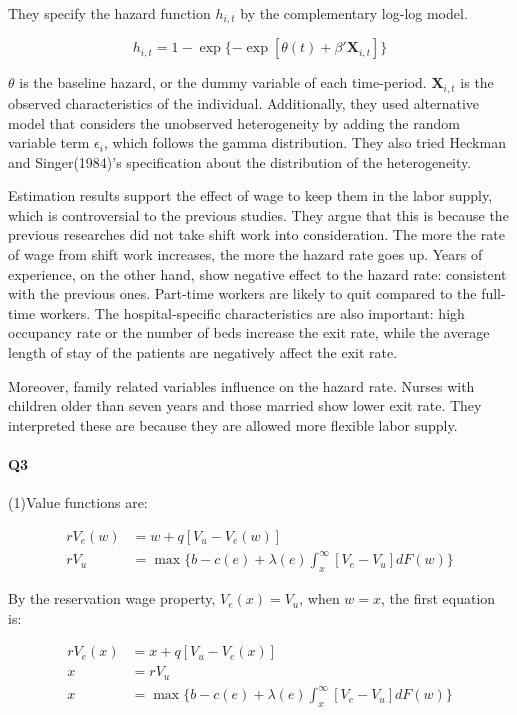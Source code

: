 \documentclass[dvipdfmx, 12pt]{article}
\begin{document}
They specify the hazard function $h_{i, t}$ by the complementary log-log model.

\[
h_{i, t} = 1 - \exp \{ - \exp[\theta(t) + \beta' \mathbf{X}_{i,t}] \}
\]

$\theta$ is the baseline hazard, or the dummy variable of each time-period. $\mathbf{X}_{i,t}$ is the observed characteristics of the individual. Additionally, they used alternative model that considers the unobserved heterogeneity by adding the random variable term $\epsilon_i$, which follows the gamma distribution. They also tried Heckman and Singer(1984)'s specification about the distribution of the heterogeneity.

\vspace{0.7zw}

Estimation results support the effect of wage to keep them in the labor supply, which is controversial to the previous studies. They argue that this is because the previous researches did not take shift work into consideration. The more the rate of wage from shift work increases, the more the hazard rate goes up. Years of experience, on the other hand, show negative effect to the hazard rate: consistent with the previous ones. Part-time workers are likely to quit compared to the full-time workers. The hospital-specific characteristics are also important: high occupancy rate or the number of beds increase the exit rate, while the average length of stay of the patients are negatively affect the exit rate.

Moreover, family related variables influence on the hazard rate. Nurses with children older than seven years and those married show lower exit rate. They interpreted these are because they are allowed more flexible labor supply.

\paragraph{Q3} \hspace{1zw}

(1)Value functions are:

\begin{align*}
  rV_e (w) &= w + q [V_u - V_e (w)] \\
  rV_u &= \max \{b - c(e) + \lambda (e) \int_x^{\infty}[V_e - V_u] d F(w) \}
\end{align*}

By the reservation wage property, $V_e(x) = V_u$, when $w = x$, the first equation is:

\begin{align*}
  r V_e (x) &= x + q [V_u - V_e(x)] \\
  x &= r V_u \\
  x &= \max \{b - c(e) + \lambda (e) \int_x^{\infty}[V_e - V_u] d F(w) \}
\end{align*}
\end{document}
